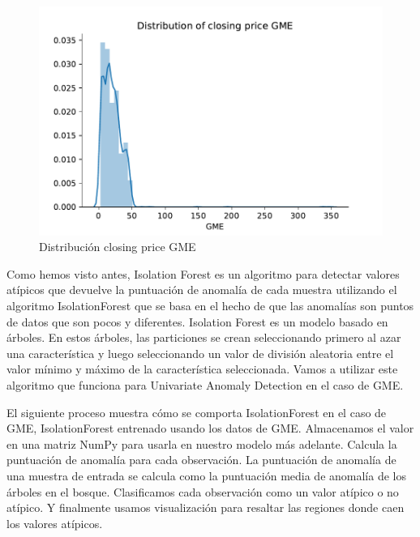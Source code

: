 \documentclass[12pt,twoside]{report}
\begin{document}
\begin{figure}[H]
\includegraphics[width=\textwidth]{../code/figures/distribution_closing_price_GME.pdf}
\centering
\caption{Distribución closing price GME}
\label{fig:dist-closing-GME}
\end{figure}

Como hemos visto antes, Isolation Forest es un algoritmo para detectar valores atípicos que devuelve la puntuación de anomalía de cada muestra utilizando el algoritmo IsolationForest que se basa en el hecho de que las anomalías son puntos de datos que son pocos y diferentes. Isolation Forest es un modelo basado en árboles. En estos árboles, las particiones se crean seleccionando primero al azar una característica y luego seleccionando un valor de división aleatoria entre el valor mínimo y máximo de la característica seleccionada. Vamos a utilizar este algoritmo que funciona para Univariate Anomaly Detection en el caso de GME. 

El siguiente proceso muestra cómo se comporta IsolationForest en el caso de GME,
IsolationForest entrenado usando los datos de GME. Almacenamos el valor en una matriz NumPy para usarla en nuestro modelo más adelante. Calcula la puntuación de anomalía para cada observación. La puntuación de anomalía de una muestra de entrada se calcula como la puntuación media de anomalía de los árboles en el bosque. Clasificamos cada observación como un valor atípico o no atípico. Y finalmente usamos visualización para resaltar las regiones donde caen los valores atípicos.
\end{document}
